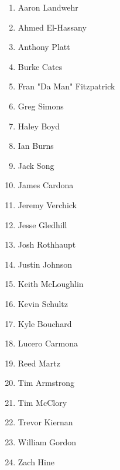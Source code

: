 \documentclass{article}
\begin{document}
\begin{multicols}{2}
\begin{enumerate}
\item Aaron Landwehr
\item Ahmed El-Hassany
\item Anthony Platt
\item Burke Cates
\item Fran "Da Man" Fitzpatrick
\item Greg Simons
\item Haley Boyd
\item Ian Burns
\item Jack Song
\item James Cardona
\item Jeremy Verchick
\item Jesse Gledhill
\item Josh Rothhaupt
\item Justin Johnson
\item Keith McLoughlin
\item Kevin Schultz
\item Kyle Bouchard
\item Lucero Carmona
\item Reed Martz
\item Tim Armstrong
\item Tim McClory
\item Trevor Kiernan
\item William Gordon
\item Zach Hine
\end{enumerate}
\end{multicols}
\end{document}
